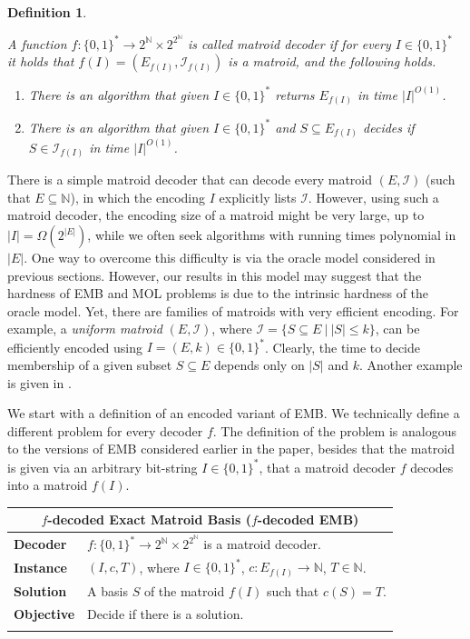 \documentclass[11pt,letter]{article}
\newcommand{\cI}{{\mathcal{I}}}
\newcommand{\problem}[2]{
	\noindent
	\begin{tabular}{ p{0.8in} p{5.4in} }
		\\
		\hline
		\multicolumn{2}{c}{#1} \\
		\hline
		#2\\
		\hline
		\\
	\end{tabular}
}
\newtheorem{definition}[lemma]{Definition}
\begin{document}
	
	\begin{definition}
		\label{def:encode}
		
		A function $f:\{0,1\}^* \rightarrow 2^{\mathbb{N}} \times 2^{2^{\mathbb{N}}}$ is called {\em matroid decoder} if for every $I \in \{0,1\}^*$ it holds that $f(I) = \left(E_{f(I)}, \cI_{f(I)} \right)$ is a matroid, and the following holds. \begin{enumerate}
			\item There is an algorithm that given $I \in \{0,1\}^*$ returns $E_{f(I)}$ in time $|I|^{O(1)}$.\label{cond:1}
			\item There is an algorithm that given $I \in \{0,1\}^*$ and $S \subseteq E_{f(I)}$ decides if $S \in \cI_{f(I)}$ in time $|I|^{O(1)}$. \label{cond:2}
		\end{enumerate} 
	\end{definition} 
	
	
	
	There is a simple matroid decoder that can decode every matroid $(E,\cI)$ (such that $E\subseteq \mathbb{N}$), in which the encoding $I$ explicitly lists $\cI$. 
	However, using such a matroid decoder, the encoding size of a matroid might be very large, up to $|I|=\Omega\left(2^{|E|}\right)$, while we often seek algorithms with running times polynomial in $|E|$. 
	One way to overcome this difficulty is via the oracle model considered  in previous sections. However, our results in this model may suggest that the hardness of EMB and MOL problems is 	due to the intrinsic hardness of the oracle model.
	 Yet, there are families of matroids with very efficient encoding. For example, a {\em uniform matroid} $(E,\cI)$, where $\cI = \{S \subseteq E~|~|S| \leq k\}$, can be efficiently encoded using $I = (E,k) \in \{0,1\}^*$. Clearly, the time to decide membership of a given subset $S \subseteq E$ depends only on $|S|$ and $k$. Another example is given in . 
	 
	


We start with a definition of an encoded variant of EMB. We technically define a different problem for every decoder $f$. The definition of the problem is analogous to the versions of EMB considered earlier in the paper, besides that the matroid is given via an arbitrary bit-string $I \in \{0,1\}^*$, that a matroid decoder $f$ decodes into a matroid $f(I)$. 

\problem{{\sc $f$-decoded Exact Matroid Basis} ($f$-decoded EMB)}{
	{\bf Decoder} & $f:\{0,1\}^* \rightarrow 2^\mathbb{N} \times 2^{2^{\mathbb{N}}}$ is a matroid decoder.\\
	{\bf Instance} &  $(I,c,T)$, where $I \in \{0,1\}^*$, $c:E_{f(I)} \rightarrow \mathbb{N}$, $T \in \mathbb{N}$.\\
	{\bf Solution} & A basis $S$ of the matroid $f(I)$ such that $c(S)=T$.\\
	{\bf Objective} & Decide if there is a solution.
}
\end{document}
